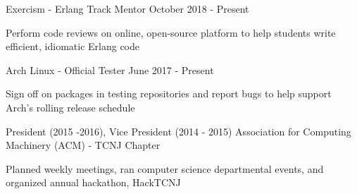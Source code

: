\begin{cventries}

  \bproject
    {Exercism - Erlang Track Mentor}
    {October 2018 - Present}
    {
      \begin{cvitems}
        \item {Perform code reviews on online, open-source platform to help students write efficient, idiomatic Erlang code}
      \end{cvitems}
    }

  \bproject
    {Arch Linux - Official Tester}
    {June 2017 - Present} %
    {
      \begin{cvitems} %
        \item {Sign off on packages in testing repositories and report bugs to help support Arch's rolling release schedule}
      \end{cvitems}
    }

  \cventry
  {President (2015 -2016), Vice President (2014 - 2015)} %
  {Association for Computing Machinery (ACM) - TCNJ Chapter} %
  {} %
  {} %
  {
    \begin{cvitems} %
    \item {Planned weekly meetings, ran computer science departmental events, and organized annual hackathon, HackTCNJ}
    \end{cvitems}
  }

\end{cventries}

